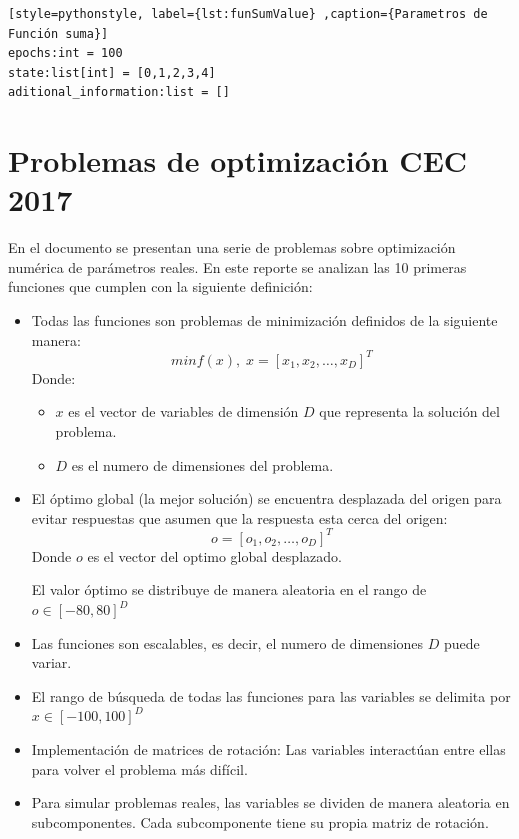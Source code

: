 \documentclass[12pt,twoside]{article}
\begin{document}
\begin{lstlisting}[style=pythonstyle, label={lst:funSumValue} ,caption={Parametros de Función suma}]
epochs:int = 100
state:list[int] = [0,1,2,3,4]
aditional_information:list = []
\end{lstlisting}

\section{Problemas de optimización CEC 2017}

En el documento \cite{cec} se presentan una serie de problemas sobre optimización numérica de parámetros reales. En este reporte se analizan las 10 primeras funciones que cumplen con la siguiente definición:
\begin{itemize}
	\item Todas las funciones son problemas de minimización definidos de la siguiente manera:
	\[ min f(x), \; x = [x_1, x_2, \dots, x_D]^T \]
	Donde:
	\begin{itemize}
		\item $x$ es el vector de variables de dimensión $D$ que representa la solución del problema.
		\item $D$ es el numero de dimensiones del problema.
	\end{itemize}
	
	\item El óptimo global (la mejor solución) se encuentra desplazada del origen para evitar respuestas que asumen que la respuesta esta cerca del origen:
	\[ o = [ o_1, o_2, \dots, o_D ]^T \]
	Donde $o$ es el vector del optimo global desplazado.
	
	El valor óptimo se distribuye de manera aleatoria en el rango de $o \in [-80, 80]^D$
	
	\item Las funciones son escalables, es decir, el numero de dimensiones $D$ puede variar.
	
	\item El rango de búsqueda de todas las funciones para las variables se delimita por $x \in [-100, 100]^D$
	
	\item Implementación de matrices de rotación: Las variables interactúan entre ellas para volver el problema más difícil.
	
	\item Para simular problemas reales, las variables se dividen de manera aleatoria en subcomponentes. Cada subcomponente tiene su propia matriz de rotación.
	
	\end{itemize}
	
\end{document}
